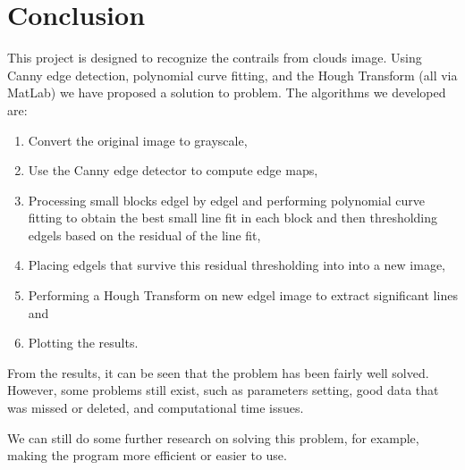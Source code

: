 \chapter{Conclusion}

This project is designed to recognize the contrails from clouds image. Using 
Canny edge detection, polynomial curve fitting, and the Hough Transform (all
via MatLab) we have proposed a solution to problem. The algorithms we developed are:
\begin{enumerate}
\item Convert the original image to grayscale,
\item Use the Canny edge detector to compute edge maps,
\item Processing small blocks edgel by edgel and performing polynomial curve fitting 
to obtain the best small line fit in each block and then thresholding edgels 
based on the residual of the line fit,
\item Placing edgels that survive this residual thresholding into into a new image,
\item Performing a Hough Transform on new edgel image to extract significant lines and
\item Plotting the results.
\end{enumerate}
From the results, it can be seen that the problem has been fairly well solved. 
However, some problems still exist, such as parameters setting, good data that 
was missed or deleted, and computational time issues.

We can still do some further research on solving this problem, for example, 
making the program more efficient or easier to use.
